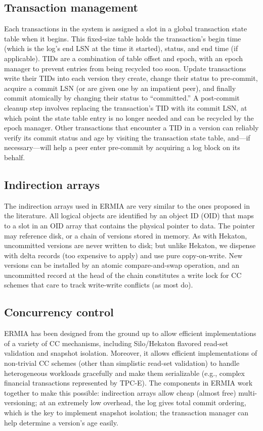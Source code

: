 \subsection{Transaction management}
Each transactions in the system is assigned a slot in a global transaction state table when it begins. This fixed-size table holds the transaction's begin time (which is the log's end LSN at the time it started), status, and end time (if applicable). TIDs are a combination of table offset and epoch, with an epoch manager to prevent entries from being recycled too soon. Update transactions write their TIDs into each version they create, change their status to pre-commit, acquire a commit LSN (or are given one by an impatient peer), and finally commit atomically by changing their status to ``committed.'' A post-commit cleanup step involves replacing the transaction's TID with its commit LSN, at which point the state table entry is no longer needed and can be recycled by the epoch manager. Other transactions that encounter a TID in a version can reliably verify its commit status and age by visiting the transaction state table, and---if necessary---will help a peer enter pre-commit by acquiring a log block on its behalf. 

\subsection{Indirection arrays}

The indirection arrays used in ERMIA are very similar to the ones proposed in the literature. All logical objects are identified by an object ID (OID) that maps to a slot in an OID array that contains the physical pointer to data. The pointer may reference disk, or a chain of versions stored in memory. As with Hekaton, uncommitted versions are never written to disk; but unlike Hekaton, we dispense with delta records (too expensive to apply) and use pure copy-on-write. New versions can be installed by an atomic compare-and-swap operation, and an uncommitted record at the head of the chain constitutes a write lock for CC schemes that care to track write-write conflicts (as most do). 

\subsection{Concurrency control}

ERMIA has been designed from the ground up to allow efficient implementations of a variety of CC mechanisms, including Silo/Hekaton flavored read-set validation and snapshot isolation. Moreover, it allows efficient implementations of non-trivial CC schemes (other than simplistic read-set validation) to handle heterogeneous workloads gracefully and make them serializable (e.g., complex financial transactions represented by TPC-E). The components in ERMIA work together to make this possible: indirection arrays allow cheap (almost free) multi-versioning; at an extremely low overhead, the log gives total commit ordering, which is the key to implement snapshot isolation; the transaction manager can help determine a version's age easily.

